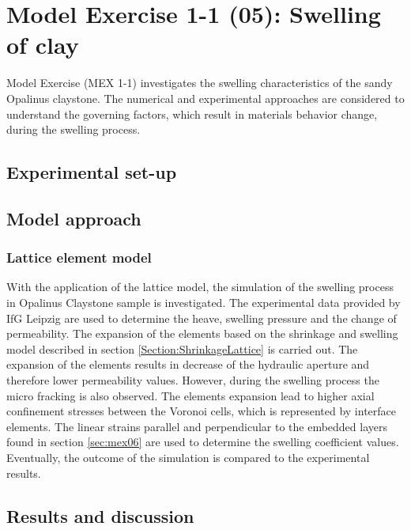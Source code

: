 \section{Model Exercise 1-1 (05): Swelling of clay}
\label{sec:mex05}
Model Exercise (MEX 1-1) investigates the swelling characteristics of the sandy Opalinus claystone. The numerical and experimental approaches are considered to understand the governing factors, which result in materials behavior change, during the swelling process. 


\subsection{Experimental set-up}




\subsection{Model approach}
\subsubsection*{Lattice element model}

With the application of the lattice model, the simulation of the swelling process in Opalinus Claystone sample is investigated. The experimental data provided by IfG Leipzig are used to determine the heave, swelling pressure and the change of permeability. The expansion of the elements based on the shrinkage and swelling model described in section \ref{Section:ShrinkageLattice} is carried out. The expansion of the elements results in decrease of the hydraulic aperture and therefore lower permeability values. However, during the swelling process the micro fracking is also observed. The elements expansion lead to higher axial confinement stresses between the Voronoi cells, which is represented by interface elements. The linear strains parallel and perpendicular to the embedded layers found in section \ref{sec:mex06} are used to determine the swelling coefficient values. Eventually, the outcome of the simulation is compared to the experimental results. 



\subsection{Results and discussion}